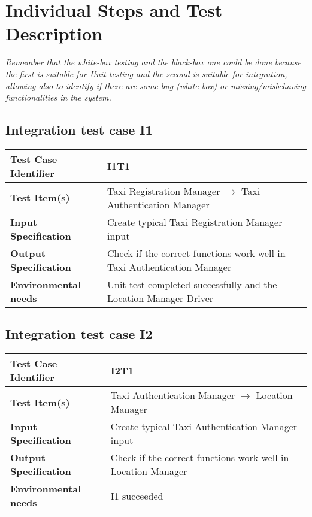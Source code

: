 \section{Individual Steps and Test Description}
\emph{Remember that the white-box testing and the black-box one could be done because the first is suitable for Unit testing and the second is suitable for integration, allowing also to identify if there are some bug (white box) or missing/misbehaving functionalities in the system.}
\subsection{Integration test case I1}
\begin{tabular} {l p{9cm}}
	\hline \textbf{Test Case Identifier} & I1T1 \\
	\hline \textbf{Test Item(s)} & Taxi Registration Manager $\rightarrow$ Taxi Authentication Manager  \\
	\hline \textbf{Input Specification} & Create typical Taxi Registration Manager input \\
	\hline \textbf{Output Specification} & Check if the correct functions work well in Taxi Authentication Manager \\
	\hline \textbf{Environmental needs} & Unit test completed successfully and the Location Manager Driver \\
	\hline 
\end{tabular}
\vspace{0.5cm}
\subsection{Integration test case I2}
\begin{tabular} {l p{9cm}}
	\hline \textbf{Test Case Identifier} & I2T1 \\
	\hline \textbf{Test Item(s)} & Taxi Authentication Manager $\rightarrow$ Location Manager \\
	\hline \textbf{Input Specification} & Create typical Taxi Authentication Manager input \\
	\hline \textbf{Output Specification} & Check if the correct functions work well in Location Manager \\
	\hline \textbf{Environmental needs} & I1 succeeded \\
	\hline 
\end{tabular}
\vspace{0.5cm}
